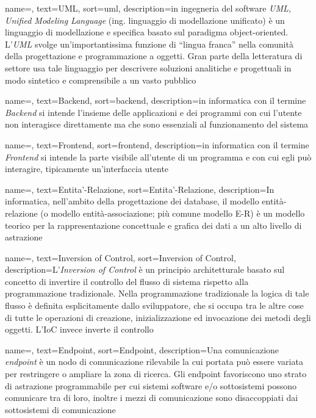 {
    name=,
    text=UML,
    sort=uml,
    description={in ingegneria del software \emph{UML, Unified Modeling Language} (ing. linguaggio di modellazione unificato) è un linguaggio di modellazione e specifica basato sul paradigma object-oriented. L'\emph{UML} svolge un'importantissima funzione di ``lingua franca'' nella comunità della progettazione e programmazione a oggetti. Gran parte della letteratura di settore usa tale linguaggio per descrivere soluzioni analitiche e progettuali in modo sintetico e comprensibile a un vasto pubblico}
}

{
    name=,
    text=Backend,
    sort=backend,
    description={in informatica con il termine \emph{Backend} si intende l'insieme delle applicazioni e dei programmi con cui l'utente non interagisce direttamente ma che sono essenziali al funzionamento del sistema}
}

{
    name=,
    text=Frontend,
    sort=frontend,
    description={in informatica con il termine \emph{Frontend} si intende la parte visibile all'utente di un programma e con cui egli può interagire, tipicamente un'interfaccia utente}
}



{
    name=,
    text=Entita'-Relazione,
    sort=Entita'-Relazione,
    description={In informatica, nell'ambito della progettazione dei database, il modello entità-relazione (o modello entità-associazione; più comune modello E-R) è un modello teorico per la rappresentazione concettuale e grafica dei dati a un alto livello di astrazione}
}

{
    name=,
    text=Inversion of Control,
    sort=Inversion of Control,
    description={L'\emph{Inversion of Control} è un principio architetturale basato sul concetto di invertire il controllo del flusso di sistema rispetto alla programmazione tradizionale. Nella programmazione tradizionale la logica di tale flusso è definita esplicitamente dallo sviluppatore, che si occupa tra le altre cose di tutte le operazioni di creazione, inizializzazione ed invocazione dei metodi degli oggetti. L'IoC invece inverte il controllo}
}

{
    name=,
    text=Endpoint,
    sort=Endpoint,
    description={Una comunicazione \emph{endpoint} è un nodo di comunicazione rilevabile la cui portata può essere variata per restringere o ampliare la zona di ricerca. Gli endpoint favoriscono uno strato di astrazione programmabile per cui sistemi software e/o sottosistemi possono comunicare tra di loro, inoltre i mezzi di comunicazione sono disaccoppiati dai sottosistemi di comunicazione}
}

